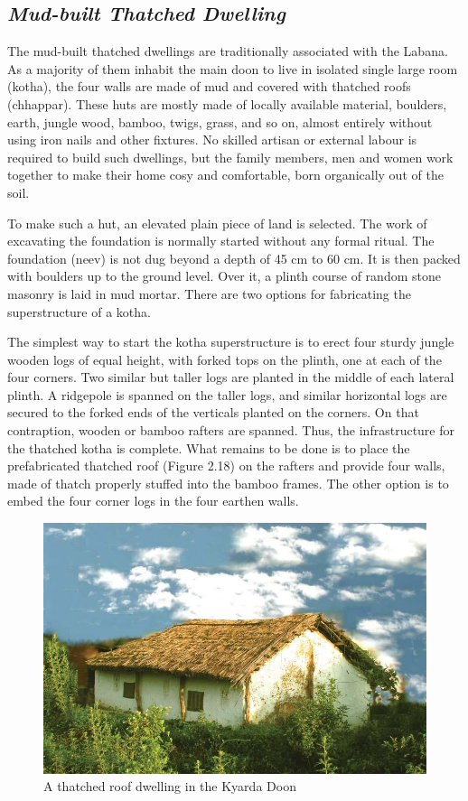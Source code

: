 \newpage

\subsection*{\textit{Mud-built Thatched Dwelling}}

The mud-built thatched dwellings are traditionally associated with the Labana. As a majority of them inhabit the main doon to live in isolated single large room (kotha), the four walls are made of mud and covered with thatched roofs (chhappar). These huts are mostly made of locally available material, boulders, earth, jungle wood, bamboo, twigs, grass, and so on, almost entirely without using iron nails and other fixtures. No skilled artisan or external labour is required to build such dwellings, but the family members, men and women work together to make their home cosy and comfortable, born organically out of the soil.

To make such a hut, an elevated plain piece of land is selected. The work of excavating the foundation is normally started without any formal ritual. The foundation (neev) is not dug beyond a depth of 45 cm to 60 cm. It is then packed with boulders up to the ground level. Over it, a plinth course of random stone masonry is laid in mud mortar. There are two options for fabricating the superstructure of a kotha.

The simplest way to start the kotha superstructure is to erect four sturdy jungle wooden logs of equal height, with forked tops on the plinth, one at each of the four corners. Two similar but taller logs are planted in the middle of each lateral plinth. A ridgepole is spanned on the taller logs, and similar horizontal logs are secured to the forked ends of the verticals planted on the corners. On that contraption, wooden or bamboo rafters are spanned. Thus, the infrastructure for the thatched kotha is complete. What remains to be done is to place the prefabricated thatched roof (Figure 2.18) on the rafters and provide four walls, made of thatch properly stuffed into the bamboo frames. The other option is to embed the four corner logs in the four earthen walls.

\begin{figure}[!htbp]
\includegraphics[scale=.32]{images/chap02-18.jpg}
\caption{A thatched roof dwelling in the Kyarda Doon}\label{chap02-fig18}
\end{figure}

